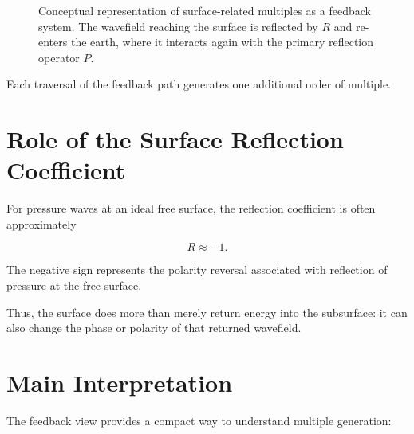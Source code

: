 \documentclass[11pt]{article}
\begin{document}
\begin{figure}[h]
\centering
{}
\caption{Conceptual representation of surface-related multiples as a feedback
system. The wavefield reaching the surface is reflected by $R$ and re-enters
the earth, where it interacts again with the primary reflection operator $P$.}
\label{fig:feedback}
\end{figure}

Each traversal of the feedback path generates one additional order of multiple.

\section{Role of the Surface Reflection Coefficient}

For pressure waves at an ideal free surface, the reflection coefficient is
often approximately

\begin{equation}
R \approx -1.
\end{equation}

The negative sign represents the polarity reversal associated with reflection
of pressure at the free surface.

Thus, the surface does more than merely return energy into the subsurface: it
can also change the phase or polarity of that returned wavefield.

\section{Main Interpretation}

The feedback view provides a compact way to understand multiple generation:
\end{document}
